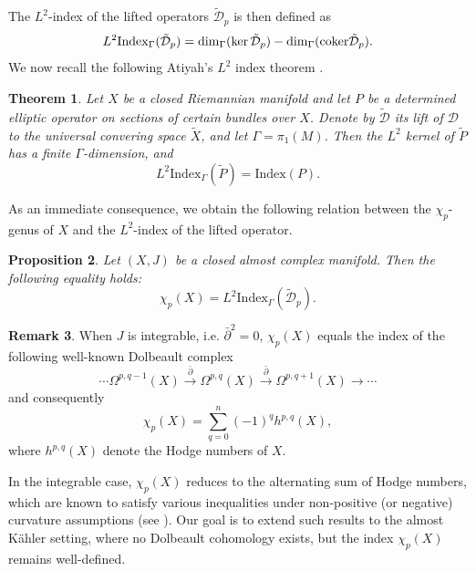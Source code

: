 \documentclass[12pt, twoside]{article}
\newtheorem{theorem}{Theorem}[section]
\newtheorem{proposition}[theorem]{Proposition}
\theoremstyle{definition}
\newtheorem{remark}[theorem]{Remark}
\numberwithin{equation}{section}
\def\Om{\Omega}
\def\pa{\partial}
\def\Ga{\Gamma}
\begin{document}
The $L^{2}$-index of the lifted operators $\tilde{\mathcal{D}}_{p}$ is then defined as 
\begin{equation*}
L^{2}\mathrm{Index}_{\Gamma}(\tilde{\mathcal{D}}_{p})=\dim_{\Gamma}(\ker\tilde{\mathcal{D}}_{p})-\dim_{\Gamma}({\rm{coker}}\tilde{\mathcal{D}}_{p}).
\end{equation*}
We now recall the following Atiyah's $L^{2}$ index theorem \cite{Ati,Pan}.
\begin{theorem}\cite[Theorem 6.1]{Pan}
	Let $X$ be a closed Riemannian manifold and let $P$ be a determined elliptic operator on sections of certain bundles over $X$. 
	Denote  by $\tilde{\mathcal{D}}$ its lift of $\mathcal{D}$ to the universal convering space $\tilde{X}$, and let $\Ga=\pi_{1}(M)$. 
	Then the $L^{2}$ kernel of $\tilde{P}$ has a finite $\Ga$-dimension, and 
	$$L^{2}\mathrm{Index}_{\Ga}(\tilde{P})=\mathrm{Index}(P).$$
\end{theorem}

As an immediate consequence, we obtain the following relation  between the $\chi_{p}$-genus of $X$ and the $L^{2}$-index of the lifted operator.

\begin{proposition}\label{Pro2}
	Let $(X,J)$ be a closed almost complex manifold. Then the following equality holds:
	\[\chi_{p}(X) = L^{2}\mathrm{Index}_{\Gamma}(\tilde{\mathcal{D}}_{p}).\]
\end{proposition}

\begin{remark}
	When $J$ is integrable, i.e. $\bar{\pa}^{2}=0$, $\chi_{p}(X)$ equals the index of the following well-known Dolbeault complex
	$$\cdots\Om^{p,q-1}(X)\xrightarrow{\bar{\pa}}\Om^{p,q}(X)\xrightarrow{\bar{\pa}}\Om^{p,q+1}(X)\rightarrow\cdots$$
	and consequently
	$$\chi_{p}(X)=\sum_{q=0}^{n}(-1)^{q}h^{p,q}(X),$$
	where $h^{p,q}(X)$ denote the Hodge numbers of  $X$. 
	
	In the integrable case, $\chi_{p}(X)$ reduces to the alternating sum of Hodge numbers, which are known to satisfy various inequalities under non-positive (or negative) curvature assumptions (see \cite{CF,Gro}). Our goal is to extend such results to the almost Kähler setting, where no Dolbeault cohomology exists, but the index $\chi_{p}(X)$ remains well-defined.	
\end{remark}
\end{document}
